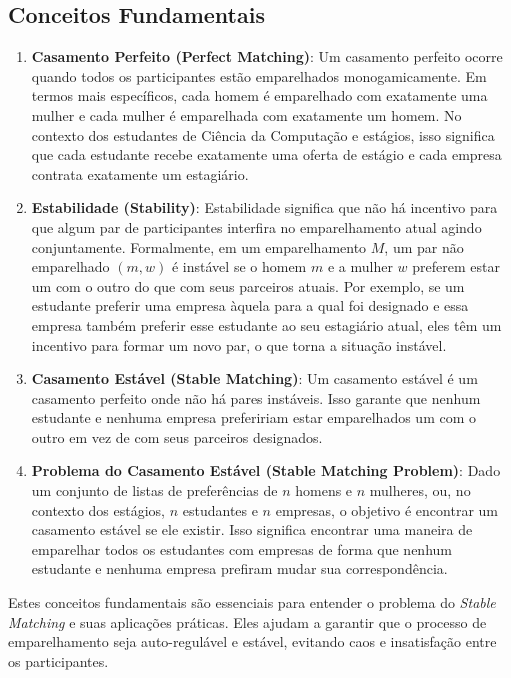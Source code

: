 \documentclass[12pt]{article}
\begin{document}
\subsection{Conceitos Fundamentais}
\begin{enumerate}
    \item \textbf{Casamento Perfeito (Perfect Matching)}: 
    Um casamento perfeito ocorre quando todos os participantes estão emparelhados monogamicamente. Em termos mais específicos, cada homem é emparelhado com exatamente uma mulher e cada mulher é emparelhada com exatamente um homem. No contexto dos estudantes de Ciência da Computação e estágios, isso significa que cada estudante recebe exatamente uma oferta de estágio e cada empresa contrata exatamente um estagiário.

    \item \textbf{Estabilidade (Stability)}: 
    Estabilidade significa que não há incentivo para que algum par de participantes interfira no emparelhamento atual agindo conjuntamente. Formalmente, em um emparelhamento \( M \), um par não emparelhado \( (m, w) \) é instável se o homem \( m \) e a mulher \( w \) preferem estar um com o outro do que com seus parceiros atuais. Por exemplo, se um estudante preferir uma empresa àquela para a qual foi designado e essa empresa também preferir esse estudante ao seu estagiário atual, eles têm um incentivo para formar um novo par, o que torna a situação instável.

    \item \textbf{Casamento Estável (Stable Matching)}:
    Um casamento estável é um casamento perfeito onde não há pares instáveis. Isso garante que nenhum estudante e nenhuma empresa prefeririam estar emparelhados um com o outro em vez de com seus parceiros designados.

    \item \textbf{Problema do Casamento Estável (Stable Matching Problem)}:
    Dado um conjunto de listas de preferências de \( n \) homens e \( n \) mulheres, ou, no contexto dos estágios, \( n \) estudantes e \( n \) empresas, o objetivo é encontrar um casamento estável se ele existir. Isso significa encontrar uma maneira de emparelhar todos os estudantes com empresas de forma que nenhum estudante e nenhuma empresa prefiram mudar sua correspondência.
\end{enumerate}

Estes conceitos fundamentais são essenciais para entender o problema do \textit{Stable Matching} e suas aplicações práticas. Eles ajudam a garantir que o processo de emparelhamento seja auto-regulável e estável, evitando caos e insatisfação entre os participantes.
\end{document}
